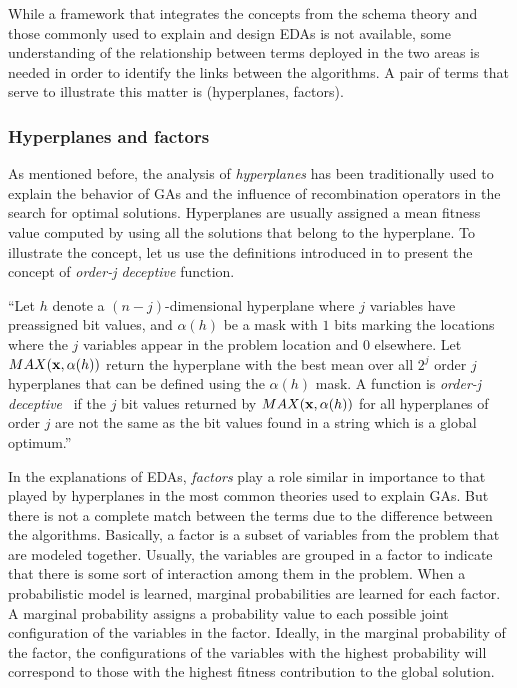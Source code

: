 \documentclass{article} %
\begin{document}
  While a framework that integrates the concepts from the schema theory and those commonly used to explain and design EDAs is not available, some understanding of the relationship between terms deployed in the two areas is needed in order to identify the links between the algorithms. A pair of terms that serve to illustrate this matter is (hyperplanes, factors). 

\subsubsection{Hyperplanes and factors}

 As mentioned before, the analysis of \emph{hyperplanes} has been traditionally used to explain the behavior of GAs and the influence of recombination operators in the search for optimal solutions. Hyperplanes are usually assigned a mean fitness value computed by using all the solutions that belong to the hyperplane. To illustrate the concept, let us use the definitions introduced in  \cite{Whitley:2015} to present the concept of \emph{order-j deceptive} function.

 ``Let  $h$ denote a $(n-j)$-dimensional hyperplane where $j$ variables have preassigned bit values, and $\alpha(h)$ be a mask with $1$ bits marking the locations where the $j$ variables appear in the problem location and $0$ elsewhere.  Let $MAX({\bf{x}},\alpha(h))$ return the hyperplane with the best mean over all $2^j$ order $j$ hyperplanes that can be defined using the  $\alpha(h)$ mask. A function is \emph{order-j deceptive}~\cite{Whitley:2015} if the $j$ bit values returned by  $MAX({\bf{x}},\alpha(h))$ for all hyperplanes of order $j$  are not the same as the bit values found in a string which is a global optimum.''


In the explanations of EDAs, \emph{factors} play a role similar in importance to that played by  hyperplanes in the most common theories used to explain GAs.  But there is not a complete match  between the terms due to the difference between the algorithms. Basically, a factor is a subset of variables from the problem that are modeled together. Usually, the variables are grouped in a factor to indicate that there is some sort of interaction among them in the problem. When a probabilistic model is learned, marginal probabilities are learned for each factor. A marginal probability assigns a probability value to each possible joint configuration of the variables in the factor.  Ideally, in the  marginal probability of the factor, the configurations of the variables with the highest probability will correspond to those with the highest fitness contribution to the global solution. 
\end{document}
